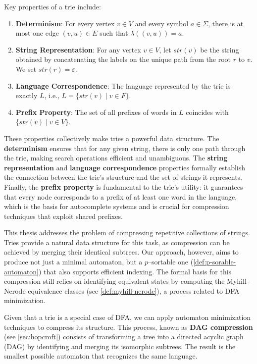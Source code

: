 Key properties of a trie include:
\begin{enumerate}
    \item \textbf{Determinism}: For every vertex $v \in V$ and every symbol $a \in \Sigma$, there is at most one edge $(v, u) \in E$ such that $\lambda((v, u)) = a$.
    \item \textbf{String Representation}: For any vertex $v \in V$, let $str(v)$ be the string obtained by concatenating the labels on the unique path from the root $r$ to $v$. We set $str(r) = \varepsilon$.
    \item \textbf{Language Correspondence}: The language represented by the trie is exactly $L$, i.e., $L = \{ str(v) \mid v \in F \}$.
    \item \textbf{Prefix Property}: The set of all prefixes of words in $L$ coincides with $\{ str(v) \mid v \in V \}$.
\end{enumerate}
These properties collectively make tries a powerful data structure. The \textbf{determinism} ensures that for any given string, there is only one path through the trie, making search operations efficient and unambiguous. The \textbf{string representation} and \textbf{language correspondence} properties formally establish the connection between the trie's structure and the set of strings it represents. Finally, the \textbf{prefix property} is fundamental to the trie's utility: it guarantees that every node corresponds to a prefix of at least one word in the language, which is the basis for autocomplete systems and is crucial for compression techniques that exploit shared prefixes.

This thesis addresses the problem of compressing repetitive collections of strings. Tries provide a natural data structure for this task, as compression can be achieved by merging their identical subtrees. Our approach, however, aims to produce not just a minimal automaton, but a $p$--sortable one (\cref{def:p-sorable-automaton}) that also supports efficient indexing. The formal basis for this compression still relies on identifying equivalent states by computing the Myhill--Nerode equivalence classes (see \cref{def:myhill-nerode}), a process related to DFA minimization.

Given that a trie is a special case of DFA, we can apply automaton minimization techniques to compress its structure. 
This process, known as \textbf{DAG compression} (see \cref{sec:hopcroft}) consists of transforming a tree into a directed acyclic graph (DAG) by identifying and merging its isomorphic subtrees. The result is the smallest possible automaton that recognizes the same language.

